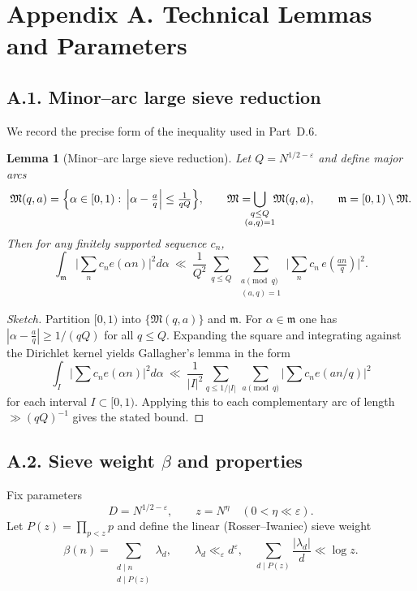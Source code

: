 \documentclass[11pt]{article}
\newtheorem{lemma}{Lemma}[section]
\theoremstyle{definition}
\theoremstyle{remark}
\begin{document}
\section*{Appendix A. Technical Lemmas and Parameters}

\subsection*{A.1. Minor--arc large sieve reduction}

We record the precise form of the inequality used in Part~D.6.

\begin{lemma}[Minor--arc large sieve reduction]\label{lem:largesieve-minor}
	Let $Q=N^{1/2-\varepsilon}$ and define major arcs
	\[
		\mathfrak M(q,a)=\Bigl\{\alpha\in[0,1):\,\Big|\alpha-\tfrac{a}{q}\Big|\le \tfrac{1}{qQ}\Bigr\},
		\qquad \mathfrak M=\!\!\!\!\!\bigcup_{\substack{q\le Q\\ (a,q)=1}}\!\!\mathfrak M(q,a),
		\qquad \mathfrak m=[0,1)\setminus\mathfrak M.
	\]
	Then for any finitely supported sequence $c_n$,
	\[
		\int_{\mathfrak m}\Big|\sum_{n}c_n e(\alpha n)\Big|^2 d\alpha
		\ \ll\ \frac{1}{Q^2}\,
		\sum_{q\le Q}\ \sum_{\substack{a\!\!\!\pmod q\\ (a,q)=1}}
		\Big|\sum_{n} c_n\,e\!\left(\tfrac{an}{q}\right)\Big|^2.
	\]
\end{lemma}

\begin{proof}[Sketch]
	Partition $[0,1)$ into $\{\mathfrak M(q,a)\}$ and $\mathfrak m$. For $\alpha\in\mathfrak m$ one has
	$|\alpha-\tfrac aq|\ge 1/(qQ)$ for all $q\le Q$. Expanding the square and integrating against the Dirichlet kernel yields Gallagher’s lemma in the form
	\[
		\int_{I} \Big|\sum c_n e(\alpha n)\Big|^2 d\alpha
		\ \ll\ \frac{1}{|I|^2}\sum_{q\le 1/|I|}\ \sum_{a\pmod q}\Big|\sum c_n e(an/q)\Big|^2
	\]
	for each interval $I\subset[0,1)$. Applying this to each complementary arc of length $\gg (qQ)^{-1}$ gives the stated bound.
\end{proof}

\subsection*{A.2. Sieve weight $\beta$ and properties}

Fix parameters
\[
	D=N^{1/2-\varepsilon},\qquad z=N^{\eta}\quad(0<\eta\ll \varepsilon).
\]
Let $P(z)=\prod_{p<z}p$ and define the linear (Rosser--Iwaniec) sieve weight
\[
	\beta(n)=\sum_{\substack{d\mid n\\ d\mid P(z)}} \lambda_d,\qquad
	\lambda_d\ll_\varepsilon d^{\varepsilon},\quad
	\sum_{d\mid P(z)}\frac{|\lambda_d|}{d}\ll \log z.
\]
\end{document}
